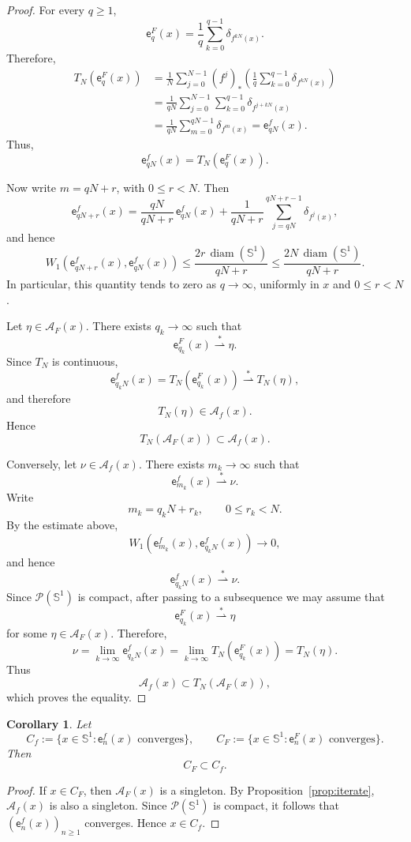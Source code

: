 \documentclass[12pt,a4paper,twoside]{article}
\theoremstyle{plain}
\newtheorem{corollary}[theorem]{Corollary}
\theoremstyle{definition}
\newcommand{\cA}{{\mathcal A}}
\newcommand{\cP}{{\mathcal P}}
\newcommand{\emp}{\mathsf e}
\newcommand{\Wone}{W_1}
\newcommand{\diam}{\operatorname{diam}}
\newcommand{\Sone}{\mathbb{S}^1}
\newcommand{\wto}{\overset{*}{\rightharpoonup}}
\begin{document}
\begin{proof}
For every \(q\ge1\),
\[
\emp_q^F(x)
=
\frac1q\sum_{k=0}^{q-1}\delta_{f^{kN}(x)}.
\]
Therefore,
\[
\begin{aligned}
T_N(\emp_q^F(x))
&=
\frac1N\sum_{j=0}^{N-1}
(f^j)_*
\left(
\frac1q\sum_{k=0}^{q-1}\delta_{f^{kN}(x)}
\right)
\\
&=
\frac1{qN}
\sum_{j=0}^{N-1}\sum_{k=0}^{q-1}
\delta_{f^{j+kN}(x)}
\\
&=
\frac1{qN}\sum_{m=0}^{qN-1}\delta_{f^m(x)}
=
\emp_{qN}^f(x).
\end{aligned}
\]
Thus,
\[
\emp_{qN}^f(x)=T_N(\emp_q^F(x)).
\]

Now write \(m=qN+r\), with \(0\le r<N\). Then
\[
\emp_{qN+r}^f(x)
=
\frac{qN}{qN+r}\,\emp_{qN}^f(x)
+
\frac1{qN+r}
\sum_{j=qN}^{qN+r-1}\delta_{f^j(x)},
\]
and hence
\[
\Wone(\emp_{qN+r}^f(x),\emp_{qN}^f(x))
\le
\frac{2r\,\diam(\Sone)}{qN+r}
\le
\frac{2N\,\diam(\Sone)}{qN+r}.
\]
In particular, this quantity tends to zero as \(q\to\infty\), uniformly
in \(x\) and \(0\le r<N\).

Let \(\eta\in\cA_F(x)\). There exists \(q_k\to\infty\) such that
\[
\emp_{q_k}^F(x)\wto\eta.
\]
Since \(T_N\) is continuous,
\[
\emp_{q_kN}^f(x)
=
T_N(\emp_{q_k}^F(x))
\wto T_N(\eta),
\]
and therefore
\[
T_N(\eta)\in\cA_f(x).
\]
Hence
\[
T_N(\cA_F(x))\subset\cA_f(x).
\]

Conversely, let \(\nu\in\cA_f(x)\). There exists \(m_k\to\infty\) such that
\[
\emp_{m_k}^f(x)\wto\nu.
\]
Write
\[
m_k=q_kN+r_k,
\qquad
0\le r_k<N.
\]
By the estimate above,
\[
\Wone(\emp_{m_k}^f(x),\emp_{q_kN}^f(x))\to0,
\]
and hence
\[
\emp_{q_kN}^f(x)\wto\nu.
\]
Since \(\cP(\Sone)\) is compact, after passing to a subsequence we may
assume that
\[
\emp_{q_k}^F(x)\wto\eta
\]
for some \(\eta\in\cA_F(x)\). Therefore,
\[
\nu
=
\lim_{k\to\infty}\emp_{q_kN}^f(x)
=
\lim_{k\to\infty}T_N(\emp_{q_k}^F(x))
=
T_N(\eta).
\]
Thus
\[
\cA_f(x)\subset T_N(\cA_F(x)),
\]
which proves the equality.
\end{proof}

\begin{corollary}\label{cor:iterate-convergence}
Let
\[
C_f:=\{x\in\Sone:\emp_n^f(x)\text{ converges}\},
\qquad
C_F:=\{x\in\Sone:\emp_n^F(x)\text{ converges}\}.
\]
Then
\[
C_F\subset C_f.
\]
\end{corollary}

\begin{proof}
If \(x\in C_F\), then \(\cA_F(x)\) is a singleton. By
Proposition~\ref{prop:iterate}, \(\cA_f(x)\) is also a singleton.
Since \(\cP(\Sone)\) is compact, it follows that
\((\emp_n^f(x))_{n\ge1}\) converges. Hence \(x\in C_f\).
\end{proof}
\end{document}
